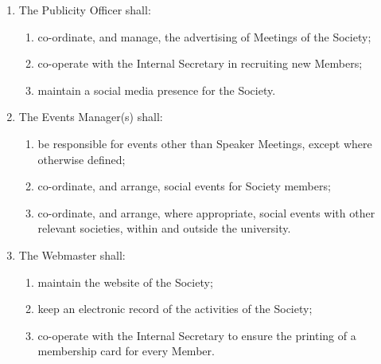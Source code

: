 \documentclass{article}
\begin{document}
\begin{enumerate}
\begin{enumerate}
  \item ensure that the Society complies with Data Protection legislation;
  \item inform the Junior Proctor of the University, the Senior Treasurer,
  and the Officers, of changes in the Constitution and of changes of
  Officers;
  \item be responsible for keeping minutes of all meetings except Subcommittee Meetings (with the minutes of Business Meetings kept in a
  different book from those of other Meetings), or appointing a deputy
  to keep minutes of a meeting if unavoidably absent from the same;
  \item maintain the Annals of the Society\footnote{The Annals of the Society
  	shall provide a complete and accurate account of the activities of the
  	Society, save for Speaker Meetings, which need only be minuted if there is a
  	Member willing to take minutes.}, and make them available to Members;
  \item be responsible for the Archives of the Society.
  \end{enumerate}
\item The Publicity Officer shall:
  \begin{enumerate}
  \item co-ordinate, and manage, the advertising of Meetings of the Society;
  \item co-operate with the Internal Secretary in recruiting new Members;
  \item maintain a social media presence for the Society.
  \end{enumerate}
\item The Events Manager(s) shall:
  \begin{enumerate}
  \item be responsible for events other than Speaker Meetings, except where
  otherwise defined;
  \item co-ordinate, and arrange, social events for Society members;
  \item co-ordinate, and arrange, where appropriate, social events with other
  relevant societies, within and outside the university.
  \end{enumerate}
\item The Webmaster shall:
	\begin{enumerate}
	\item maintain the website of the Society;
	\item keep an electronic record of the activities of the Society;
	\item co-operate with the Internal Secretary to ensure the printing of a membership card for every Member.

\end{enumerate}
\end{enumerate}
\end{document}
